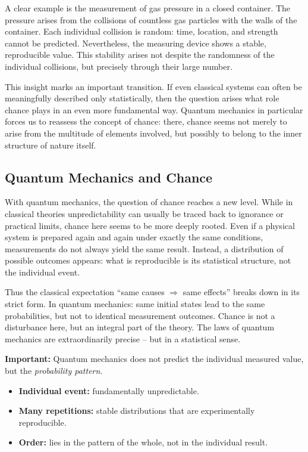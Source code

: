 A clear example is the measurement of gas pressure in a closed container.
The pressure arises from the collisions of countless gas particles
with the walls of the container.
Each individual collision is random:
time, location, and strength
cannot be predicted.
Nevertheless, the measuring device
shows a stable, reproducible value.
This stability arises not despite the randomness
of the individual collisions,
but precisely through their large number.

This insight marks an important transition.
If even classical systems
can often be meaningfully described only statistically,
then the question arises
what role chance plays in an even more fundamental way.
Quantum mechanics
in particular forces us
to reassess the concept of chance:
there, chance seems not merely to arise
from the multitude of elements involved,
but possibly to belong
to the inner structure of nature itself.

\subsection{Quantum Mechanics and Chance}

With quantum mechanics, the question of chance reaches a new level.
While in classical theories unpredictability
can usually be traced back to ignorance
or practical limits,
chance here seems to be more deeply rooted.
Even if a physical system
is prepared again and again under exactly the same conditions,
measurements do not always yield the same result.
Instead, a distribution of possible outcomes appears:
what is reproducible is its statistical structure,
not the individual event.

Thus the classical expectation
``same causes $\Rightarrow$ same effects''
breaks down in its strict form.
In quantum mechanics:
same initial states
lead to the same probabilities,
but not to identical measurement outcomes.
Chance is not a disturbance here,
but an integral part of the theory.
The laws of quantum mechanics
are extraordinarily precise --
but in a statistical sense.

\begin{DidacticBox}
	\label{box:predicts}
	\small
	\textbf{Important:} Quantum mechanics does not predict the individual measured value,
	but the \emph{probability pattern}.
	\begin{itemize}
		\item \textbf{Individual event:} fundamentally unpredictable.
		\item \textbf{Many repetitions:} stable distributions that are experimentally reproducible.
		\item \textbf{Order:} lies in the pattern of the whole, not in the individual result.
	\end{itemize}
\end{DidacticBox}

